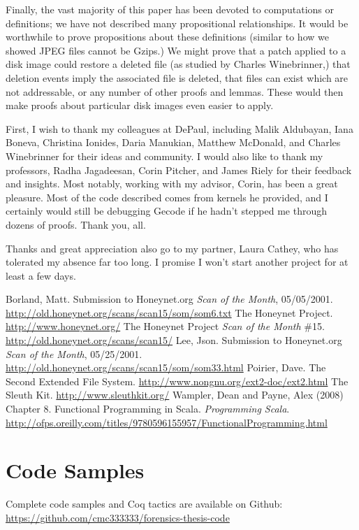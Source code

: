 \documentclass[nocopyrightspace]{sigplanconf}
\begin{document}
Finally, the vast majority of this paper has been devoted to computations or
definitions; we have not described many propositional relationships. It would
be worthwhile to prove propositions about these definitions (similar to how we
showed JPEG files cannot be Gzips.) We might prove that a patch applied to a
disk image could restore a deleted file (as studied by Charles Winebrinner,)
that deletion events imply the associated file is deleted, that files can
exist which are not addressable, or any number of other proofs and lemmas.
These would then make proofs about particular disk images even easier to
apply.

\acks
First, I wish to thank my colleagues at DePaul, including Malik Aldubayan,
Iana Boneva, Christina Ionides, Daria Manukian, Matthew McDonald, and Charles
Winebrinner for their ideas and community. I would also like to thank my
professors, Radha Jagadeesan, Corin Pitcher, and James Riely for their
feedback and insights. Most notably, working with my advisor, Corin, has been
a great pleasure. Most of the code described comes from kernels he provided,
and I certainly would still be debugging Gecode if he hadn't stepped me
through dozens of proofs. Thank you, all.

Thanks and great appreciation also go to my partner, Laura Cathey, who has
tolerated my absence far too long. I promise I won't start another project for
at least a few days.





\begin{thebibliography}{}
\softraggedright

  Borland, Matt. Submission to Honeynet.org \emph{Scan of the Month},
  05/05/2001. \url{http://old.honeynet.org/scans/scan15/som/som6.txt}
  The Honeynet Project. \url{http://www.honeynet.org/}
  The Honeynet Project \emph{Scan of the Month} \#15.
  \url{http://old.honeynet.org/scans/scan15/}
  Lee, Json. Submission to Honeynet.org \emph{Scan of the Month}, 05/25/2001.
  \url{http://old.honeynet.org/scans/scan15/som/som33.html}
  Poirier, Dave. The Second Extended File System.
  \url{http://www.nongnu.org/ext2-doc/ext2.html}
  The Sleuth Kit. \url{http://www.sleuthkit.org/}
  Wampler, Dean and Payne, Alex (2008) Chapter 8. Functional Programming in
  Scala. {\em Programming Scala}. 
  \url{http://ofps.oreilly.com/titles/9780596155957/FunctionalProgramming.html}

\end{thebibliography}

\appendix

\section{Code Samples}
Complete code samples and Coq tactics are available on Github:
\url{https://github.com/cmc333333/forensics-thesis-code}
\end{document}
